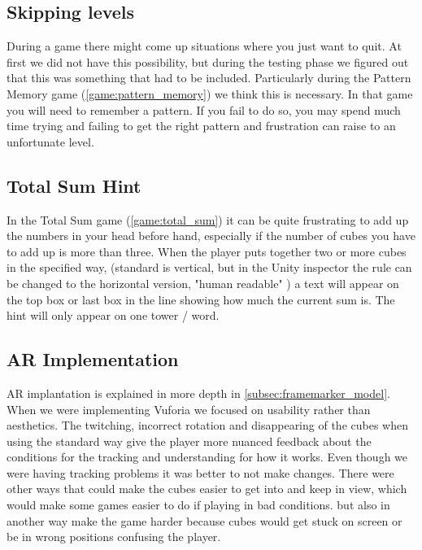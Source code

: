 \subsection{Skipping levels}
During a game there might come up situations where you just want to quit. At
first we did not have this possibility, but during the testing phase we figured
out that this was something that had to be included. Particularly during the
Pattern Memory game (\ref{game:pattern_memory}) we think this is necessary. In
that game you will need to remember a pattern. If you fail to do so, you may
spend much time trying and failing to get the right pattern and frustration can
raise to an unfortunate level. 

\subsection{Total Sum Hint}
In the Total Sum game (\ref{game:total_sum}) it can be quite frustrating to add up the numbers in your head before hand, especially if the number of cubes you have to add up is more than three. When the player puts together two or more cubes in the specified way, (standard is vertical, but in the Unity inspector the rule can be changed to the horizontal version, "human readable" ) a text will appear on the top box or last box in the line showing how much the current sum is. The hint will only appear on one tower / word.

\subsection{AR Implementation}
AR implantation is explained in more depth in \ref{subsec:framemarker_model}.
When we were implementing Vuforia we focused on usability rather than aesthetics. The twitching, incorrect rotation and disappearing of the cubes when using the standard way give the player more nuanced feedback about the conditions for the tracking and understanding for how it works. Even though we were having tracking problems it was better to not make changes. There were other ways that could make the cubes easier to get into and keep in view, which would make some games easier to do if playing in bad conditions. but also in another way make the game harder because cubes would get stuck on screen or be in wrong positions confusing the player.

